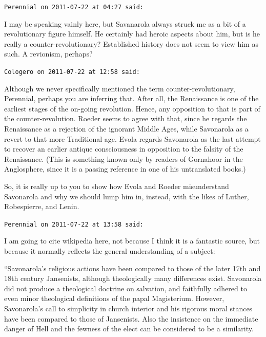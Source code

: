 \begin{footnotesize}\begin{sffamily}



\texttt{Perennial on 2011-07-22 at 04:27 said: }

I may be speaking vainly here, but Savanarola always struck me as a bit of a revolutionary figure himself. He certainly had heroic aspects about him, but is he really a counter-revolutionary? Established history does not seem to view him as such. A revionism, perhaps?


\hfill

\texttt{Cologero on 2011-07-22 at 12:58 said: }

Although we never specifically mentioned the term counter-revolutionary, Perennial, perhaps you are inferring that. After all, the Renaissance is one of the earliest stages of the on-going revolution. Hence, any opposition to that is part of the counter-revolution. Roeder seems to agree with that, since he regards the Renaissance as a rejection of the ignorant Middle Ages, while Savonarola as a revert to that more Traditional age. Evola regards Savonarola as the last attempt to recover an earlier antique consciousness in opposition to the falsity of the Renaissance. (This is something known only by readers of Gornahoor in the Anglosphere, since it is a passing reference in one of his untranslated books.)

So, it is really up to you to show how Evola and Roeder misunderstand Savonarola and why we should lump him in, instead, with the likes of Luther, Robespierre, and Lenin.


\hfill

\texttt{Perennial on 2011-07-22 at 13:58 said: }

I am going to cite wikipedia here, not because I think it is a fantastic source, but because it normally reflects the general understanding of a subject:

``Savonarola's religious actions have been compared to those of the later 17th and 18th century Jansenists, although theologically many differences exist. Savonarola did not produce a theological doctrine on salvation, and faithfully adhered to even minor theological definitions of the papal Magisterium. However, Savonarola's call to simplicity in church interior and his rigorous moral stances have been compared to those of Jansenists. Also the insistence on the immediate danger of Hell and the fewness of the elect can be considered to be a similarity.


\end{sffamily}
\end{footnotesize}
